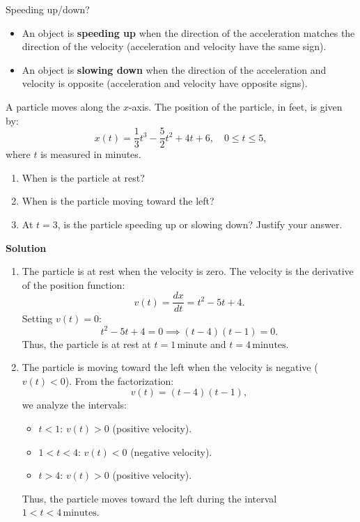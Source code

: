 \documentclass[12pt]{article}
\theoremstyle{beautifulthm}
\begin{document}
\begin{Note}{Speeding up/down?}{}

\begin{itemize}
    \item An object is \textbf{speeding up} when the direction of the acceleration matches the direction of the velocity (acceleration and velocity have the same sign).
    \item An object is \textbf{slowing down} when the direction of the acceleration and velocity is opposite (acceleration and velocity have opposite signs).
\end{itemize}


\end{Note}

\begin{tcolorbox}[colback=examplebg, colframe=red!75!black, title=\textbf{EXAMPLE 1:  Position of a particle}, fonttitle=\bfseries, sharp corners]
A particle moves along the \( x \)-axis. The position of the particle, in feet, is given by:
\[
x(t) = \frac{1}{3}t^3 - \frac{5}{2}t^2 + 4t + 6, \quad 0 \leq t \leq 5,
\]
where \( t \) is measured in minutes.
\begin{enumerate}
    \item[(a)] When is the particle at rest?
    \item[(b)] When is the particle moving toward the left?
    \item[(c)] At \( t = 3 \), is the particle speeding up or slowing down? Justify your answer.
\end{enumerate}
\tcblower
\textbf{Solution}
\begin{enumerate}
    \item[(a)] The particle is at rest when the velocity is zero. The velocity is the derivative of the position function:
    \[
    v(t) = \frac{dx}{dt} = t^2 - 5t + 4.
    \]
    Setting \( v(t) = 0 \):
    \[
    t^2 - 5t + 4 = 0 \implies (t - 4)(t - 1) = 0.
    \]
    Thus, the particle is at rest at \( t = 1 \, \text{minute} \) and \( t = 4 \, \text{minutes.} \)

    \item[(b)] The particle is moving toward the left when the velocity is negative (\( v(t) < 0 \)). From the factorization:
    \[
    v(t) = (t - 4)(t - 1),
    \]
    we analyze the intervals:
    \begin{itemize}
        \item \( t < 1 \): \( v(t) > 0 \) (positive velocity).
        \item \( 1 < t < 4 \): \( v(t) < 0 \) (negative velocity).
        \item \( t > 4 \): \( v(t) > 0 \) (positive velocity).
    \end{itemize}
    Thus, the particle moves toward the left during the interval \( 1 < t < 4 \, \text{minutes.} \)


\end{enumerate}
\end{tcolorbox}
\end{document}
